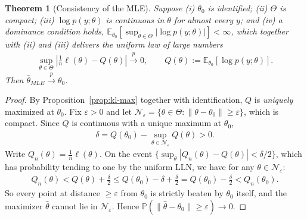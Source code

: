 \documentclass[11pt]{article}
\theoremstyle{definition}
\theoremstyle{plain}
\newtheorem{theorem}{Theorem}[section]
\theoremstyle{remark}
\begin{document}
\begin{theorem}[Consistency of the MLE]
    Suppose (i) $\theta_0$ is identified; (ii) $\Theta$ is compact; (iii) $\log p(y;\theta)$ is continuous in $\theta$ for almost every $y$; and (iv) a dominance condition holds, $\mathbb{E}_{\theta_0}[\sup_{\theta\in\Theta}|\log p(y;\theta)|] < \infty$, which together with (ii) and (iii) delivers the uniform law of large numbers
    \begin{align}
        \sup_{\theta \in \Theta}\left| \tfrac{1}{n}\ell(\theta) - Q(\theta) \right| \xrightarrow{p} 0, \qquad Q(\theta) := \mathbb{E}_{\theta_0}[\log p(y;\theta)].
    \end{align}
    Then $\hat{\theta}_{MLE} \xrightarrow{p} \theta_0$.
\end{theorem}
\begin{proof}
    By Proposition~\ref{prop:kl-max} together with identification, $Q$ is \emph{uniquely} maximized at $\theta_0$. Fix $\varepsilon > 0$ and let $\mathcal{N}_\varepsilon = \{\theta \in \Theta : \|\theta - \theta_0\| \geq \varepsilon\}$, which is compact. Since $Q$ is continuous with a unique maximum at $\theta_0$,
    \begin{align}
        \delta = Q(\theta_0) - \sup_{\theta \in \mathcal{N}_\varepsilon} Q(\theta) > 0.
    \end{align}
    Write $Q_n(\theta) = \frac{1}{n}\ell(\theta)$. On the event $\{\sup_\theta |Q_n(\theta) - Q(\theta)| < \delta/2\}$, which has probability tending to one by the uniform LLN, we have for any $\theta \in \mathcal{N}_\varepsilon$:
    \begin{align}
        Q_n(\theta) < Q(\theta) + \tfrac{\delta}{2} \leq Q(\theta_0) - \delta + \tfrac{\delta}{2} = Q(\theta_0) - \tfrac{\delta}{2} < Q_n(\theta_0).
    \end{align}
    So every point at distance $\geq \varepsilon$ from $\theta_0$ is strictly beaten by $\theta_0$ itself, and the maximizer $\hat{\theta}$ cannot lie in $\mathcal{N}_\varepsilon$. Hence $\mathbb{P}(\|\hat{\theta}-\theta_0\| \geq \varepsilon) \to 0$.
\end{proof}
\end{document}
